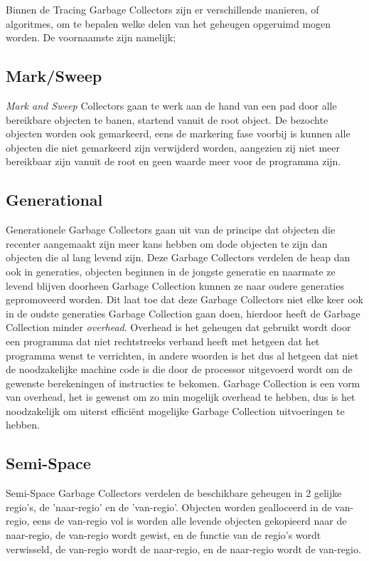 Binnen de Tracing Garbage Collectors zijn er verschillende manieren, of algoritmes, om te bepalen welke delen van het geheugen opgeruimd mogen worden.
De voornaamste zijn namelijk;
\subsection{Mark/Sweep}
\textit{Mark and Sweep} Collectors gaan te werk aan de hand van een pad door alle bereikbare objecten te banen, startend vanuit de root object. De bezochte objecten worden ook gemarkeerd, eens de markering fase voorbij is kunnen alle objecten die niet gemarkeerd zijn verwijderd worden, aangezien zij niet meer bereikbaar zijn vanuit de root en geen waarde meer voor de programma zijn.


\subsection{Generational}
\label{sec:generational}    
Generationele Garbage Collectors gaan uit van de principe dat objecten die recenter aangemaakt zijn meer kans hebben om dode objecten te zijn dan objecten die al lang levend zijn.
Deze Garbage Collectors verdelen de heap dan ook in generaties, objecten beginnen in de jongste generatie en naarmate ze levend blijven doorheen Garbage Collection kunnen ze naar oudere generaties gepromoveerd worden.
Dit laat toe dat deze Garbage Collectors niet elke keer ook in de oudste generaties Garbage Collection gaan doen, hierdoor heeft de Garbage Collection minder \textit{overhead}.
Overhead is het geheugen dat gebruikt wordt door een programma dat niet rechtstreeks verband heeft met hetgeen dat het programma wenst te verrichten, in andere woorden is het dus al hetgeen dat niet de noodzakelijke machine code is die door de processor uitgevoerd wordt om de gewenste berekeningen of instructies te bekomen.
Garbage Collection is een vorm van overhead, het is gewenst om zo min mogelijk overhead te hebben, dus is het noodzakelijk om uiterst efficiënt mogelijke Garbage Collection uitvoeringen te hebben.



\subsection{Semi-Space}
\label{sec:semi-space}    
Semi-Space Garbage Collectors verdelen de beschikbare geheugen in 2 gelijke regio's, de 'naar-regio' en de 'van-regio'.
Objecten worden gealloceerd in de van-regio, eens de van-regio vol is worden alle levende objecten gekopieerd naar de naar-regio, de van-regio wordt gewist, en de functie van de regio's wordt verwisseld, de van-regio wordt de naar-regio, en de naar-regio wordt de van-regio.
\autocite{Byers2007}



